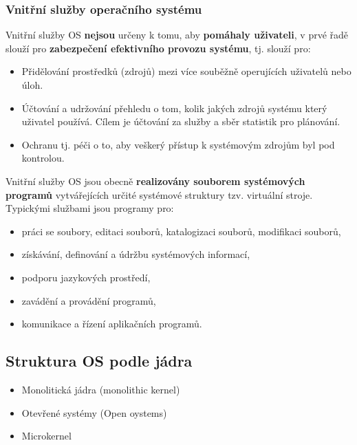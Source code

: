 \subsubsection{Vnitřní služby operačního systému}
Vnitřní služby OS \textbf{nejsou} určeny k tomu, aby \textbf{pomáhaly uživateli}, v prvé řadě slouží pro \textbf{zabezpečení efektivního provozu systému}, tj. slouží pro:
\begin{itemize}
	\item Přidělování prostředků (zdrojů) mezi více souběžně operujících uživatelů nebo úloh.
	\item Účtování a udržování přehledu o tom, kolik jakých zdrojů systému který uživatel používá. Cílem je účtování za služby a sběr statistik pro plánování.
	\item Ochranu tj. péči o to, aby veškerý přístup k systémovým zdrojům byl pod kontrolou.
\end{itemize}
Vnitřní služby OS jsou obecně \textbf{realizovány souborem systémových programů} vytvářejících určité systémové struktury tzv. virtuální stroje. Typickými službami jsou programy pro:
\begin{itemize}
	\item práci se soubory, editaci souborů, katalogizaci souborů, modifikaci souborů,
	\item získávání, definování a údržbu systémových informací,
	\item podporu jazykových prostředí,
	\item zavádění a provádění programů,
	\item komunikace a řízení aplikačních programů.
\end{itemize}

\subsection{Struktura OS podle jádra}
\begin{itemize}
	\item Monolitická jádra (monolithic kernel)
	\item Otevřené systémy (Open oystems)
	\item Microkernel
\end{itemize}
